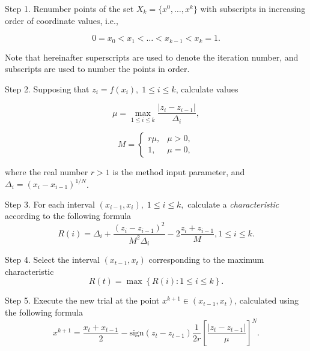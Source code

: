 \documentclass[mathematics,article,submit,pdftex,moreauthors]{Definitions/mdpi}
\begin{document}
Step 1. Renumber points of the set $X_k=\{x^0,\dots,x^k\} $ with subscripts in increasing order of coordinate values, i.e.,

\begin{linenomath}
\begin{equation}
0=x_0<x_1<\dots <x_{k-1}<x_{k}=1.
\end{equation}
\end{linenomath}
Note that hereinafter superscripts are used to denote the iteration number, and subscripts are used to number the points in order.

Step 2. Supposing that  $z_i=f(x_i), \; 1\leq i \leq k$, calculate values 

\begin{linenomath}
\begin{equation}\label{mu}
\mu = \max_{1\leq i \leq k}\frac{\left|z_i-z_{i-1}\right|}{\Delta_i},
\end{equation}
\end{linenomath}

\begin{linenomath}
\begin{equation}
M = \left\{
   \begin{array}{lr}
     r\mu, & \mu > 0,\\
     1, & \mu = 0,
   \end{array}
\right.
\end{equation}
\end{linenomath}
where the real number $r>1$ is the method input parameter, and $\Delta_i=\left(x_i-x_{i-1}\right)^{1/N}$.

Step 3. For each interval $(x_{i-1}, x_i), \; 1\leq i \leq k,$ calculate a \textit{characteristic} according to the following formula
\begin{equation}\label{R}
R(i)=\Delta_i+\frac{(z_i-z_{i-1})^2}{M^2\Delta_i}-2\frac{z_i+z_{i-1}}{M},1 \leq i \leq k.
\end{equation}

Step 4. Select the interval $(x_{t-1},x_t)$ corresponding to the maximum characteristic
\begin{equation}\label{MaxR}
R(t)=\max{\left\{R(i): 1 \leq i \leq k \right\}}.
\end{equation}

Step 5. Execute the new trial at the point $x^{k+1}\in(x_{t-1},x_t)$, calculated using the following formula
\begin{equation}\label{NewX}
x^{k+1} = \frac{x_t+x_{t-1}}{2} - \mathrm{sign}(z_t-z_{t-1})\frac{1}{2r}\left[\frac{\left|z_t-z_{t-1}\right|}{\mu}\right]^N.
\end{equation}
\end{document}
